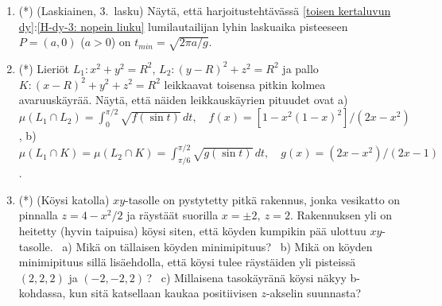 \begin{enumerate}
\item (*) 
(Laskiainen, 3.\ lasku) Näytä, että harjoitustehtävässä
\ref{toisen kertaluvun dy}:\ref{H-dy-3: nopein liuku} lumilautailijan lyhin laskuaika
pisteeseen $P=(a,0)$ ($a>0$) on $t_{min}=\sqrt{2\pi a/g}$.

\item (*)
Lieriöt $L_1: x^2+y^2=R^2$, $L_2: (y-R)^2+z^2=R^2$ ja pallo $K: (x-R)^2+y^2+z^2=R^2$ leikkaavat
toisensa pitkin kolmea avaruuskäyrää. Näytä, että näiden leikkauskäyrien pituudet 
ovat \vspace{1mm}\newline
a) \,\ $\mu(L_1 \cap L_2) = \int_0^{\pi/2} \sqrt{f(\sin t)}\,dt, \quad
                                   f(x)=[1-x^2(1-x)^2]/(2x-x^2)$, \newline
b) \,\ $\mu(L_1 \cap K) = \mu(L_2 \cap K) = \int_{\pi/6}^{\pi/2} \sqrt{g(\sin t)}\,dt, \quad
                                   g(x)=(2x-x^2)/(2x-1)$.

\item (*) 
(Köysi katolla) $xy$-tasolle on pystytetty pitkä rakennus, jonka vesikatto on pinnalla
$z = 4-x^2/2$ ja räystäät suorilla $x=\pm 2,\ z=2$.
Rakennuksen yli on heitetty (hyvin taipuisa) köysi siten, että köyden kumpikin pää ulottuu 
$xy$-tasolle. \ a) Mikä on tällaisen köyden minimipituus? \ b) Mikä on köyden
minimipituus sillä lisäehdolla, että köysi tulee räystäiden yli pisteissä $(2, 2, 2)$ ja
$(-2, -2, 2)\,$? \
c) Millaisena tasokäyränä köysi näkyy b-kohdassa, kun sitä katsellaan kaukaa positiivisen
$z$-akselin suunnasta? 

\end{enumerate}
